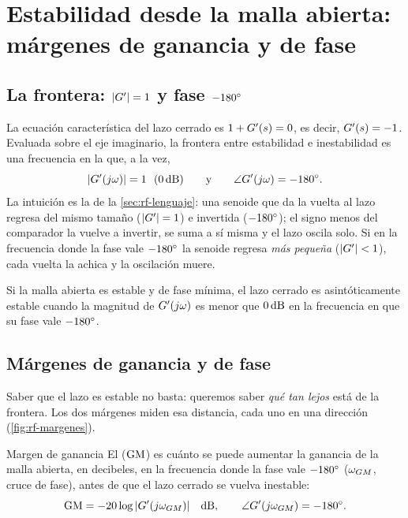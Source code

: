 \section{Estabilidad desde la malla abierta: márgenes de ganancia y de fase}
\label{sec:rf-estabilidad}

\subsection{La frontera: $|G'|=1$ y fase $-180^{\circ}$}

La ecuación característica del lazo cerrado es $1+G'(s)=0$, es decir, $G'(s)=-1$. Evaluada sobre el eje imaginario, la frontera entre estabilidad e inestabilidad es una frecuencia en la que, a la vez,
\begin{equation}
  |G'(j\omega)|=1\ \ (0\,\mathrm{dB})\qquad\text{y}\qquad \angle G'(j\omega)=-180^{\circ} .
  \label{eq:rf-frontera}
\end{equation}
La intuición es la de la \cref{sec:rf-lenguaje}: una senoide que da la vuelta al lazo regresa del mismo tamaño ($|G'|=1$) e invertida ($-180^{\circ}$); el signo menos del comparador la vuelve a invertir, se suma a sí misma y el lazo oscila solo. Si en la frecuencia donde la fase vale $-180^{\circ}$ la senoide regresa \emph{más pequeña} ($|G'|<1$), cada vuelta la achica y la oscilación muere.

\begin{ideaclave}
Si la malla abierta es estable y de fase mínima, el lazo cerrado es asintóticamente estable cuando la magnitud de $G'(j\omega)$ es menor que $0\,\mathrm{dB}$ en la frecuencia en que su fase vale $-180^{\circ}$.
\end{ideaclave}

\subsection{Márgenes de ganancia y de fase}

Saber que el lazo es estable no basta: queremos saber \emph{qué tan lejos} está de la frontera. Los dos márgenes miden esa distancia, cada uno en una dirección (\cref{fig:rf-margenes}).

\begin{definicion}[label=def:rf-gm]{Margen de ganancia}
El  ($\mathrm{GM}$) es cuánto se puede aumentar la ganancia de la malla abierta, en decibeles, en la frecuencia donde la fase vale $-180^{\circ}$ ($\omega_{GM}$, cruce de fase), antes de que el lazo cerrado se vuelva inestable:
\begin{equation}
  \mathrm{GM}=-20\log|G'(j\omega_{GM})|\quad\text{dB},\qquad \angle G'(j\omega_{GM})=-180^{\circ}.
\end{equation}
\end{definicion}

